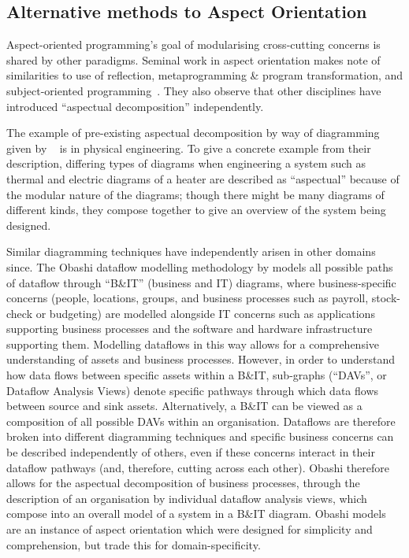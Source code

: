 \subsection{Alternative methods to Aspect Orientation}

Aspect-oriented programming's goal of modularising cross-cutting concerns is
shared by other paradigms. Seminal work in aspect orientation makes note of
similarities to use of reflection, metaprogramming \& program transformation,
and subject-oriented programming~\cite{kiczales1997aspect,aspectj_intro}. They
also observe that other disciplines have introduced ``aspectual decomposition''
independently.

The example of pre-existing aspectual decomposition by way of diagramming given
by \citeauthor{kiczales1997aspect}~\cite{kiczales1997aspect} is in physical
engineering. To give a concrete example from their description, differing types
of diagrams when engineering a system such as thermal and electric diagrams of a
heater are described as ``aspectual'' because of the modular nature of the
diagrams; though there might be many diagrams of different kinds, they compose
together to give an overview of the system being designed.

Similar diagramming techniques have independently arisen in other domains since.
The Obashi dataflow modelling methodology\cite{obashimethodology} by
\citeauthor{obashimethodology} models all possible paths of dataflow through
``B\&IT'' (business and IT) diagrams, where business-specific concerns (people,
locations, groups, and business processes such as payroll, stock-check or
budgeting) are modelled alongside IT concerns such as applications supporting
business processes and the software and hardware infrastructure supporting them.
Modelling dataflows in this way allows for a comprehensive understanding of
assets and business processes. However, in order to understand how data flows
between specific assets within a B\&IT, sub-graphs (``DAVs'', or Dataflow
Analysis Views) denote specific pathways through which data flows between source
and sink assets. Alternatively, a B\&IT can be viewed as a composition of all
possible DAVs within an organisation. Dataflows are therefore broken into
different diagramming techniques and specific business concerns can be described
independently of others, even if these concerns interact in their dataflow
pathways (and, therefore, cutting across each other). Obashi therefore allows
for the aspectual decomposition of business processes, through the description
of an organisation by individual dataflow analysis views, which compose into an
overall model of a system in a B\&IT diagram. Obashi models are an instance of
aspect orientation which were designed for simplicity and
comprehension\cite{obashimethodology,seow2011obashi}, but trade this for
domain-specificity.

